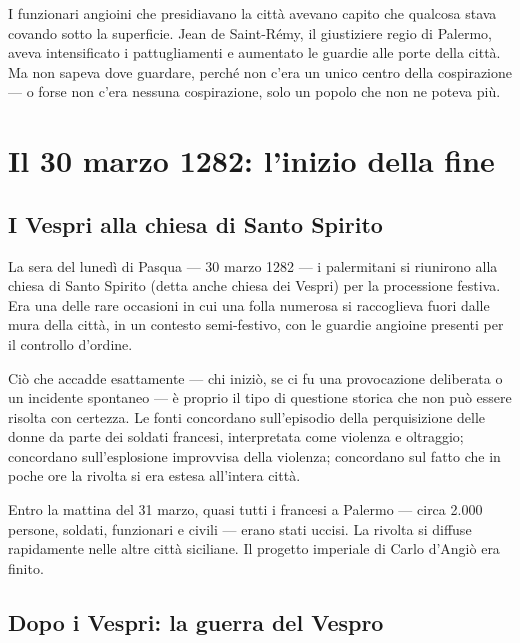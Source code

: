 I funzionari angioini che presidiavano la città avevano capito che qualcosa
stava covando sotto la superficie. Jean de Saint-Rémy, il giustiziere
regio di Palermo, aveva intensificato i pattugliamenti e aumentato le
guardie alle porte della città. Ma non sapeva dove guardare, perché
non c'era un unico centro della cospirazione — o forse non c'era nessuna
cospirazione, solo un popolo che non ne poteva più.

\secsep

\section{Il 30 marzo 1282: l'inizio della fine}

\subsection{I Vespri alla chiesa di Santo Spirito}

La sera del lunedì di Pasqua — 30 marzo 1282 — i palermitani si riunirono
alla chiesa di Santo Spirito (detta anche chiesa dei Vespri) per la
processione festiva. Era una delle rare occasioni in cui una folla numerosa
si raccoglieva fuori dalle mura della città, in un contesto semi-festivo,
con le guardie angioine presenti per il controllo d'ordine.

Ciò che accadde esattamente — chi iniziò, se ci fu una provocazione
deliberata o un incidente spontaneo — è proprio il tipo di questione
storica che non può essere risolta con certezza. Le fonti concordano
sull'episodio della perquisizione delle donne da parte dei soldati
francesi, interpretata come violenza e oltraggio; concordano sull'esplosione
improvvisa della violenza; concordano sul fatto che in poche ore la
rivolta si era estesa all'intera città.


Entro la mattina del 31 marzo, quasi tutti i francesi a Palermo — circa
2.000 persone, soldati, funzionari e civili — erano stati uccisi. La
rivolta si diffuse rapidamente nelle altre città siciliane. Il progetto
imperiale di Carlo d'Angiò era finito.

\subsection{Dopo i Vespri: la guerra del Vespro}

